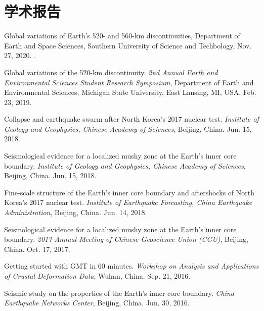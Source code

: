 \section*{学术报告}
\begin{etaremune}
\item
	Global variations of Earth's 520- and 560-km discontinuities,
	Department of Earth and Space Sciences, Southern University of Science and Techbology,
	Nov. 27, 2020.
	\invited.
\item
    Global variations of the 520-km discontinuity.
    \textit{ 2nd Annual Earth and Environmental Sciences Student Research Symposium},
    Department of Earth and Environmental Sciences, Michigan State University, East Lansing, MI, USA.
    Feb. 23, 2019.
\item
    Collapse and earthquake swarm after North Korea's 2017 nuclear test.
    \textit{Institute of Geology and Geophysics, Chinese Academy of Sciences}, Beijing, China.
    Jun. 15, 2018.
\item
    Seismological evidence for a localized mushy zone at the Earth's inner core boundary.
    \textit{Institute of Geology and Geophysics, Chinese Academy of Sciences}, Beijing, China.
    Jun. 15, 2018.
    \invited
\item
    Fine-scale structure of the Earth's inner core boundary and aftershocks of North Korea's 2017 nuclear test.
    \textit{Institute of Earthquake Forcasting, China Earthquake Administration}, Beijing, China.
    Jun. 14, 2018.
\item
    Seismological evidence for a localized mushy zone at the Earth's inner core boundary.
    \textit{2017 Annual Meeting of Chinese Geoscience Union (CGU)}, Beijing, China.
    Oct. 17, 2017.
    \invited
\item
    Getting started with GMT in 60 minutes.
    \textit{Workshop on Analysis and Applications of Crustal Deformation Data}, Wuhan, China.
    Sep. 21, 2016.
    \invited
\item
    Seismic study on the properties of the Earth's inner core boundary.
    \textit{China Earthquake Networks Center}, Beijing, China.
    Jun. 30, 2016.
    \invited
\end{etaremune}
